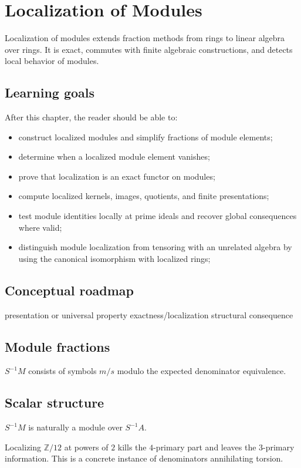 \chapter{Localization of Modules}
\label{ch:v07}

Localization of modules extends fraction methods from rings to linear algebra over rings. It is exact, commutes with finite algebraic constructions, and detects local behavior of modules.

\section*{Learning goals}
After this chapter, the reader should be able to:
\begin{itemize}
\item construct localized modules and simplify fractions of module elements;
\item determine when a localized module element vanishes;
\item prove that localization is an exact functor on modules;
\item compute localized kernels, images, quotients, and finite presentations;
\item test module identities locally at prime ideals and recover global consequences where valid;
\item distinguish module localization from tensoring with an unrelated algebra by using the canonical isomorphism with localized rings;
\end{itemize}
\section*{Conceptual roadmap}
\volroadmap
  {presentation or universal property}
  {exactness/localization}
  {structural consequence}

\section{Module fractions}
$S^{-1}M$ consists of symbols $m/s$ modulo the expected denominator equivalence.

\section{Scalar structure}
$S^{-1}M$ is naturally a module over $S^{-1}A$.

\begin{example}\label{ex:v07-expand-01}
Localizing $\mathbb Z/12$ at powers of $2$ kills the $4$-primary part and leaves the $3$-primary information. This is a concrete instance of denominators annihilating torsion.
\end{example}

